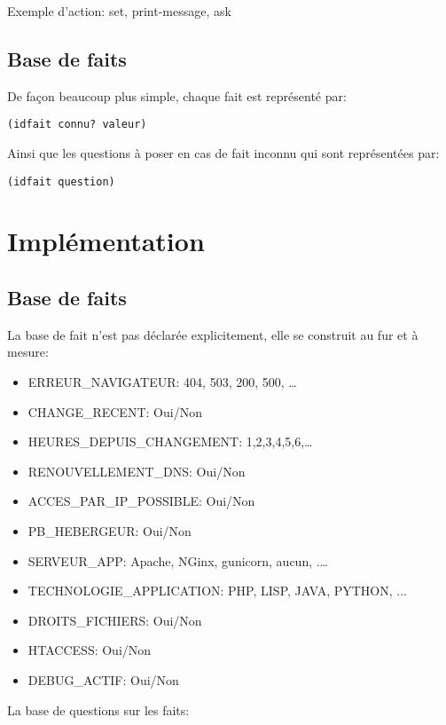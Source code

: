 \documentclass[a4paper, 10pt, leqno]{report}
\theoremstyle{plain}
\begin{document}
Exemple d'action: set, print-message, ask

 \section{Base de faits}

De façon beaucoup plus simple, chaque fait est représenté par:
\begin{lstlisting}
(idfait connu? valeur)
\end{lstlisting}

Ainsi que les questions à poser en cas de fait inconnu qui sont représentées par:

\begin{lstlisting}
(idfait question)
\end{lstlisting}

\chapter{Implémentation}

\section{Base de faits}

La base de fait n'est pas déclarée explicitement, elle se construit au fur et à mesure:

\begin{itemize}
  \item ERREUR\_NAVIGATEUR: 404, 503, 200, 500, \ldots
  \item CHANGE\_RECENT: Oui/Non
  \item HEURES\_DEPUIS\_CHANGEMENT: 1,2,3,4,5,6,\ldots
  \item RENOUVELLEMENT\_DNS: Oui/Non
  \item ACCES\_PAR\_IP\_POSSIBLE: Oui/Non
  \item PB\_HEBERGEUR: Oui/Non
  \item SERVEUR\_APP: Apache, NGinx, gunicorn, aucun, .\ldots
  \item TECHNOLOGIE\_APPLICATION: PHP, LISP, JAVA, PYTHON, ...
  \item DROITS\_FICHIERS: Oui/Non
  \item HTACCESS: Oui/Non
  \item DEBUG\_ACTIF: Oui/Non
\end{itemize}

La base de questions sur les faits:
\end{document}
